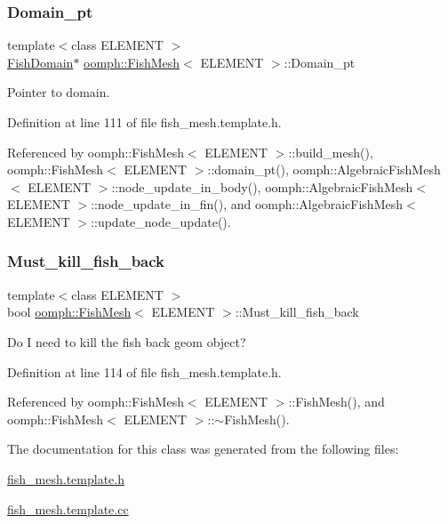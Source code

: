 \subsubsection{\texorpdfstring{Domain\+\_\+pt}{Domain\_pt}}
{\footnotesize\ttfamily template$<$class E\+L\+E\+M\+E\+NT $>$ \\
\hyperlink{classoomph_1_1FishDomain}{Fish\+Domain}$\ast$ \hyperlink{classoomph_1_1FishMesh}{oomph\+::\+Fish\+Mesh}$<$ E\+L\+E\+M\+E\+NT $>$\+::Domain\+\_\+pt\hspace{0.3cm}{\ttfamily [protected]}}



Pointer to domain. 



Definition at line 111 of file fish\+\_\+mesh.\+template.\+h.



Referenced by oomph\+::\+Fish\+Mesh$<$ E\+L\+E\+M\+E\+N\+T $>$\+::build\+\_\+mesh(), oomph\+::\+Fish\+Mesh$<$ E\+L\+E\+M\+E\+N\+T $>$\+::domain\+\_\+pt(), oomph\+::\+Algebraic\+Fish\+Mesh$<$ E\+L\+E\+M\+E\+N\+T $>$\+::node\+\_\+update\+\_\+in\+\_\+body(), oomph\+::\+Algebraic\+Fish\+Mesh$<$ E\+L\+E\+M\+E\+N\+T $>$\+::node\+\_\+update\+\_\+in\+\_\+fin(), and oomph\+::\+Algebraic\+Fish\+Mesh$<$ E\+L\+E\+M\+E\+N\+T $>$\+::update\+\_\+node\+\_\+update().

\mbox{\label{classoomph_1_1FishMesh_ad1dd5a431f711d3ac14498cc6ab4d856}} 
\subsubsection{\texorpdfstring{Must\+\_\+kill\+\_\+fish\+\_\+back}{Must\_kill\_fish\_back}}
{\footnotesize\ttfamily template$<$class E\+L\+E\+M\+E\+NT $>$ \\
bool \hyperlink{classoomph_1_1FishMesh}{oomph\+::\+Fish\+Mesh}$<$ E\+L\+E\+M\+E\+NT $>$\+::Must\+\_\+kill\+\_\+fish\+\_\+back\hspace{0.3cm}{\ttfamily [protected]}}



Do I need to kill the fish back geom object? 



Definition at line 114 of file fish\+\_\+mesh.\+template.\+h.



Referenced by oomph\+::\+Fish\+Mesh$<$ E\+L\+E\+M\+E\+N\+T $>$\+::\+Fish\+Mesh(), and oomph\+::\+Fish\+Mesh$<$ E\+L\+E\+M\+E\+N\+T $>$\+::$\sim$\+Fish\+Mesh().



The documentation for this class was generated from the following files\+:\begin{DoxyCompactItemize}
\item 
\hyperlink{fish__mesh_8template_8h}{fish\+\_\+mesh.\+template.\+h}\item 
\hyperlink{fish__mesh_8template_8cc}{fish\+\_\+mesh.\+template.\+cc}\end{DoxyCompactItemize}
